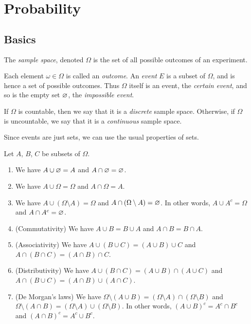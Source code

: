 \chapter{Probability}

\section{Basics}

\begin{definition}
  The \emph{sample space}, denoted $\Omega$ is the set of all possible outcomes of an experiment.

  Each element $\omega \in \Omega$ is called an \emph{outcome}. An \emph{event} $E$ is a subset of $\Omega$, and is hence a set of possible outcomes. Thus $\Omega$ itself is an event, the \emph{certain event}, and so is the empty set $\varnothing$, the \emph{impossible event}.
\end{definition}

\begin{definition}
  If $\Omega$ is countable, then we say that it is a \emph{discrete} sample space. Otherwise, if $\Omega$ is uncountable, we say that it is a \emph{continuous} sample space.
\end{definition}

Since events are just sets, we can use the usual properties of sets.

\begin{proposition}
  Let $A$, $B$, $C$ be subsets of $\Omega$.
  \begin{enumerate}
    \item We have $A \cup \varnothing = A$ and $A \cap \varnothing = \varnothing$.
    \item We have $A \cup \Omega = \Omega$ and $A \cap \Omega = A$. 
    \item We have $A \cup (\Omega \setminus A) = \Omega$ and $A \cap (\Omega \setminus A) = \varnothing$. In other words, $A \cup A^{c} =\Omega$ and $A \cap A^{c} = \varnothing$.
    \item (Commutativity) We have $A \cup B = B \cup A$  and $A \cap B = B \cap A$.
    \item (Associativity) We have $A \cup (B \cup C) = (A \cup B) \cup C$ and $A \cap (B \cap C) = (A \cap B) \cap C$.
    \item (Distributivity) We have $A \cup (B \cap C) = (A \cup B) \cap (A \cup C)$ and $A \cap (B \cup C) = (A \cap B) \cup (A \cap C)$.
    \item (De Morgan's laws) We have $\Omega \setminus (A \cup B) = (\Omega \setminus A) \cap (\Omega \setminus B)$ and $\Omega \setminus (A \cap B) = (\Omega \setminus A) \cup (\Omega \setminus B)$. In other words, $(A \cup B)^{c} = A^{c} \cap B^{c}$ and $(A \cap B)^{c} = A^{c} \cup B^{c}$.
  \end{enumerate}
\end{proposition}

